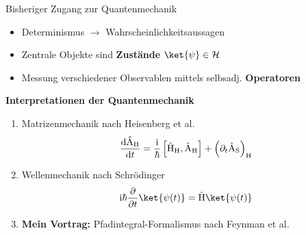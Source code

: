 \begin{frame}{Bisheriger Zugang zur Quantenmechanik}
\begin{itemize}
	\item Determinismus $\longrightarrow $ Wahrscheinlichkeitsaussagen
	\item Zentrale Objekte sind \textbf{Zustände} $\ket{\psi} \in \mathcal{H}$
	\item Messung verschiedener Observablen mittels selbsadj. \textbf{Operatoren}
\end{itemize}
\begin{center}
	\textbf{Interpretationen der Quantenmechanik}
\end{center}
\begin{enumerate}
	\item Matrizenmechanik  nach Heisenberg et al.
	\begin{align*}
	\frac{\mathrm{d}\hat{\text{A}}_{{\rm H}}}{\mathrm{d}t}=\frac{\mathrm{i}}{\hbar}\left[\hat{\text{H}}_{\rm H},\hat{\text{A}}_{\rm H}\right]+\left( \partial_t \hat{\text{A}}_{\rm S}\right)_{\rm H}
	\end{align*}
	\item Wellenmechanik nach Schrödinger
	\begin{align*}
		\mathrm{i}\hbar \frac{\partial}{\partial t} \ket{\psi(t)} = \hat{\text{H}} \ket{\psi(t)}
	\end{align*}
	\item \textbf{Mein Vortrag:} Pfadintegral-Formalismus nach Feynman et al. 
\end{enumerate}
\end{frame}
